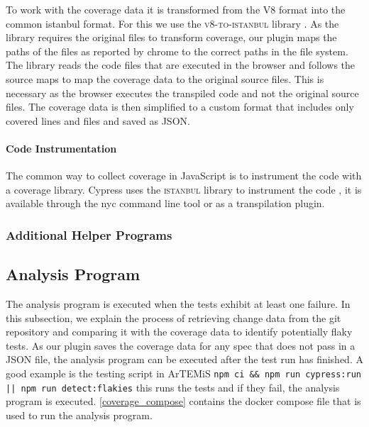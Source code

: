 To work with the coverage data it is transformed from the V8 format into the common istanbul format.
For this we use the \textsc{v8-to-istanbul} library \autocite{noauthor_v8--istanbul_2023}.
As the library requires the original files to transform coverage, our plugin maps the paths of the files as reported by chrome to the correct paths in the file system.
The library reads the code files that are executed in the browser and follows the source maps to map the coverage data to the original source files.
This is necessary as the browser executes the transpiled code and not the original source files.
The coverage data is then simplified to a custom format that includes only covered lines and files and saved as JSON.

\paragraph{Code Instrumentation} The common way to collect coverage in JavaScript is to instrument the code with a coverage library.
Cypress uses the \textsc{istanbul} library to instrument the code \autocite{noauthor_code_nodate}, it is available through the nyc command line tool \autocite{noauthor_nyc_2023} or as a transpilation plugin.


\subsubsection{Additional Helper Programs}

\subsection{Analysis Program}
The analysis program is executed when the tests exhibit at least one failure.
In this subsection, we explain the process of retrieving change data from the git repository and comparing it with the coverage data to identify potentially flaky tests.
As our plugin saves the coverage data for any spec that does not pass in a JSON file, the analysis program can be executed after the test run has finished.
A good example is the testing script in ArTEMiS \texttt{npm ci \&\& npm run cypress:run || npm run detect:flakies} this runs the tests and if they fail, the analysis program is executed.
\cref{coverage_compose} contains the docker compose file that is used to run the analysis program.

